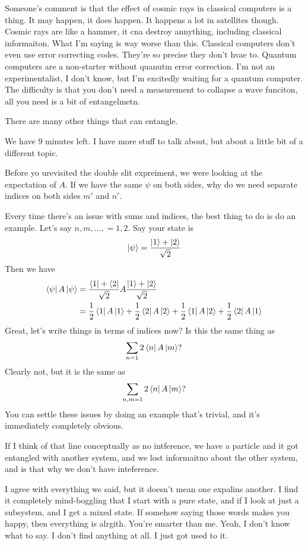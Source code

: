 Someone's comment is that the effect of cosmic rays in classical computers is a
thing.
It may happen, it does happen.
It happens a lot in satellites though.
Cosmic rays are like a hammer,
it cna destroy annything,
including classical informaiton.
What I'm saying is way worse than this.
Classical computers don't even use error correcting codes.
They're so precise they don't hvae to.
Quantum computers are a non-starter without quanutm error correction.
I'm not an experimentalist,
I don't know,
but I'm excitedly waiting for a quantum computer.
The difficulty is that you don't need a measurement to collapse a wave funciton,
all you need is a bit of entangelmetn.

There are many other things that can entangle.

We have 9 minutes left.
I have more stuff to talk about,
but about a little bit of a different topic.

\begin{question}
    Before yo urevisited the double slit expreiment,
    we were looking at the expectation of $A$.
    If we have the same $\psi$ on both sides,
    why do we need separate indices on both sides $m'$ and $n'$.
\end{question}
Every time there's an issue with sums and indices,
the best thing to do is do an example.
Let's say $n,m,\ldots, = 1,2$.
Say your state is
\begin{align}
    \ket{\psi} = \frac{\ket{1} + \ket{2}}{\sqrt{2}}
\end{align}
Then we have
\begin{align}
    \bra{\psi}A\ket{\psi} &=
    \frac{\bra{1} + \bra{2}}{\sqrt{2}} A
    \frac{\ket{1} + \ket{2}}{\sqrt{2}}\\
    &=
    \frac{1}{2} \bra{1} A\ket{1}
    + \frac{1}{2} \bra{2} A\ket{2}
    + \frac{1}{2} \bra{1} A\ket{2}
    + \frac{1}{2} \bra{2} A\ket{1}
\end{align}
Great, let's write things in terms of indices now?
Is this the same thing as
\begin{align}
    \sum_{n=1}2\bra{n}A\ket{m}?
\end{align}
Clearly not,
but it is the same as
\begin{align}
   \sum_{n,m=1}2\bra{n}A\ket{m}?
\end{align}
You can settle these issues by doing an example that's trivial,
and it's immediately completely obvious.

\begin{question}
    If I think of that line conceptually as no intference,
    we have a particle and it got entangled with another system,
    and we lost informaitno about the other system,
    and is that why we don't have inteference.
\end{question}
I agree with everything we said,
but it doesn't mean one expalins another.
I find it completely mind-boggling
that I start with a pure state,
and if I look at just a subsystem,
and I get a mixed state.
If somehow saying those words makes you happy,
then everything is alrgith.
You're smarter than me.
Yeah, I don't know what to say.
I don't find anything at all.
I just got used to it.

